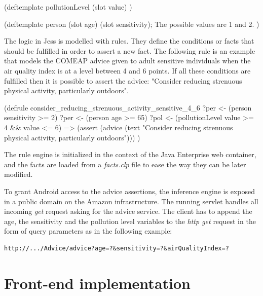 {\centering
\begin{spverbatim}
(deftemplate pollutionLevel
    (slot value)
)

(deftemplate person
    (slot age)
    (slot sensitivity); The possible values are 1 and 2.
)
\end{spverbatim}
\par
}

The logic in Jess is modelled with rules. They define the conditions or facts that should be fulfilled in order to assert a new fact. The following rule is an example that models the COMEAP advice given to adult sensitive individuals when the air quality index is at a level between 4 and 6 points. If all these conditions are fulfilled then it is possible to assert the advice: "Consider reducing strenuous physical activity, particularly outdoors". 

{\centering
\begin{spverbatim}
(defrule consider_reducing_strenuous_activity_sensitive_4_6
    ?per <- (person {sensitivity >= 2})
    ?per <- (person {age >= 65})
    ?pol <- (pollutionLevel {value >= 4 && value <= 6})
    =>
    (assert
        (advice (text "Consider reducing strenuous physical activity, particularly outdoors")))
)
\end{spverbatim}
\par
}
The rule engine is initialized in the context of the Java Enterprise web container, and the facts are loaded from a \textit{facts.clp} file to ease the way they can be later modified. 

To grant Android access to the advice assertions, the inference engine is exposed in a public domain on the Amazon infrastructure. The running servlet handles all incoming \textit{get} request asking for the advice service. The client has to append the age, the sensitivity and the pollution level variables to the \textit{http get} request in the form of query parameters as in the following example: \bigskip

{\centering
\begin{BVerbatim}
http://.../Advice/advice?age=?&sensitivity=?&airQualityIndex=?
\end{BVerbatim}
\par
}

\section{Front-end implementation}
